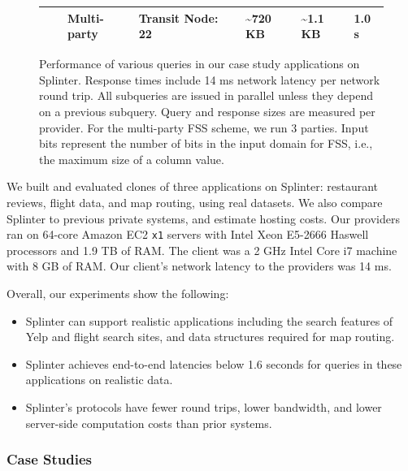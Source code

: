 \begin{figure}
{\begin{tabular}{llllp{1cm}p{2cm}p{2cm}p{1.5cm}}
			& & Multi-party & Transit Node: 22 & & \textasciitilde 720 KB & \textasciitilde 1.1 KB & 1.0 s \\
			\bottomrule
		\end{tabular}
	}
	\caption[Performance results for Splinter case studies.]{Performance of various queries in our case study applications on Splinter. 
		Response times include 14 ms network latency per network round trip. All subqueries are issued in parallel
		unless they depend on a previous subquery. Query and response sizes are measured per provider. For the multi-party FSS scheme, we run 3 parties.
		Input bits represent the number of bits in the input domain for FSS, i.e., the maximum size of a column value.}
	\label{fig:big-results}
\end{figure}

We built and evaluated clones of three applications 
on Splinter: restaurant reviews, flight data, and map routing, using real datasets.
We also compare Splinter to previous private systems, and estimate hosting costs.
Our providers ran on 64-core Amazon EC2 \texttt{x1} servers with Intel Xeon E5-2666 Haswell processors and 1.9 TB 
of RAM. The client was a 2 GHz Intel Core i7 machine with 8 GB of RAM.
Our client's network latency to the providers was 14 ms.

Overall, our experiments show the following: 
\begin{itemize}
	\item{Splinter can support realistic applications including the search features of Yelp and flight search sites, and data structures
		required for map routing.}
	\item{Splinter achieves end-to-end latencies below 1.6 seconds for queries in these applications on realistic data.}
	\item{Splinter's protocols have fewer round trips, lower bandwidth, and lower server-side computation costs than prior systems.}
\end{itemize}


\subsubsection{Case Studies}
\label{sec:case_studies}

